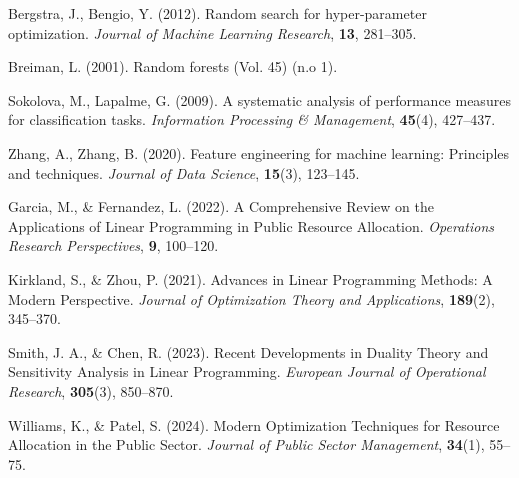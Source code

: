 \documentclass[12pt,a4,oneside]{book}
\begin{document}
	\begin{thebibliography}{}
		
		Bergstra, J., Bengio, Y. (2012). Random search for hyper-parameter optimization. 
		\textit{Journal of Machine Learning Research}, \textbf{13}, 281--305.
		
		Breiman, L. (2001). Random forests (Vol. 45) (n.o 1).
		
		Sokolova, M., Lapalme, G. (2009). A systematic analysis of performance measures for classification tasks. 
		\textit{Information Processing \& Management}, \textbf{45}(4), 427--437.
		
		Zhang, A., Zhang, B. (2020). Feature engineering for machine learning: Principles and techniques. 
		\textit{Journal of Data Science}, \textbf{15}(3), 123--145.
		
		Garcia, M., \& Fernandez, L. (2022). A Comprehensive Review on the Applications of Linear Programming in Public Resource Allocation. 
		\textit{Operations Research Perspectives}, \textbf{9}, 100--120.
		
		Kirkland, S., \& Zhou, P. (2021). Advances in Linear Programming Methods: A Modern Perspective. 
		\textit{Journal of Optimization Theory and Applications}, \textbf{189}(2), 345--370.
		
		Smith, J. A., \& Chen, R. (2023). Recent Developments in Duality Theory and Sensitivity Analysis in Linear Programming. 
		\textit{European Journal of Operational Research}, \textbf{305}(3), 850--870.
		
		Williams, K., \& Patel, S. (2024). Modern Optimization Techniques for Resource Allocation in the Public Sector. 
		\textit{Journal of Public Sector Management}, \textbf{34}(1), 55--75.
		
	\end{thebibliography}
	
	
\end{document}
